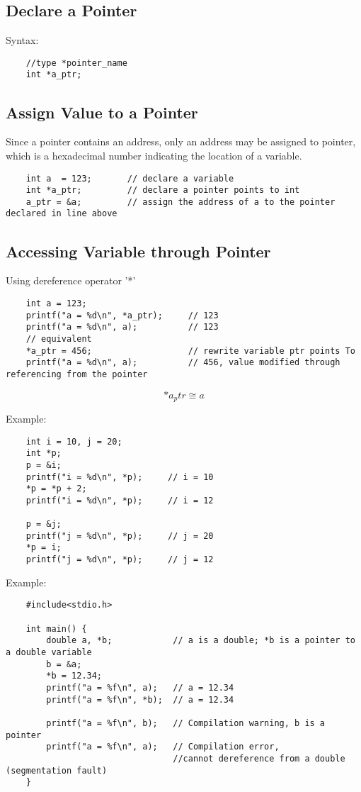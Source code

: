 \documentclass[12pt]{article} %
\begin{document}
\subsection{Declare a Pointer}
Syntax:
\begin{lstlisting}
    //type *pointer_name
    int *a_ptr;
\end{lstlisting}
\subsection{Assign Value to a Pointer}
Since a pointer contains an address, only an address may be assigned to pointer, which is a hexadecimal number indicating the location of a variable.
\begin{lstlisting}
    int a  = 123;       // declare a variable
    int *a_ptr;         // declare a pointer points to int
    a_ptr = &a;         // assign the address of a to the pointer declared in line above
\end{lstlisting}

\subsection{Accessing Variable through Pointer}
Using dereference operator '*'
\begin{lstlisting}
    int a = 123;
    printf("a = %d\n", *a_ptr);     // 123
    printf("a = %d\n", a);          // 123
    // equivalent 
    *a_ptr = 456;                   // rewrite variable ptr points To
    printf("a = %d\n", a);          // 456, value modified through referencing from the pointer
\end{lstlisting}
\[*a_ptr \cong a\]

Example:
\begin{lstlisting}
    int i = 10, j = 20;
    int *p;
    p = &i;
    printf("i = %d\n", *p);     // i = 10
    *p = *p + 2;
    printf("i = %d\n", *p);     // i = 12
    
    p = &j;
    printf("j = %d\n", *p);     // j = 20
    *p = i;
    printf("j = %d\n", *p);     // j = 12
\end{lstlisting}

Example:
\begin{lstlisting}
    #include<stdio.h>

    int main() {
        double a, *b;            // a is a double; *b is a pointer to a double variable
        b = &a;
        *b = 12.34;
        printf("a = %f\n", a);   // a = 12.34
        printf("a = %f\n", *b);  // a = 12.34

        printf("a = %f\n", b);   // Compilation warning, b is a pointer
        printf("a = %f\n", a);   // Compilation error, 
                                 //cannot dereference from a double (segmentation fault)
    }
\end{lstlisting}
\end{document}
